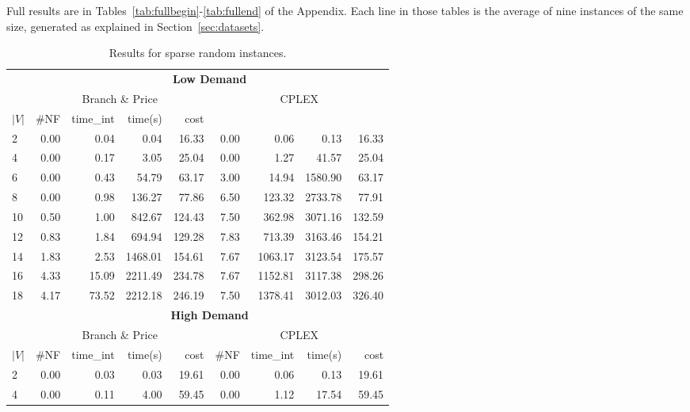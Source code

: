 Full results are in Tables~\ref{tab:fullbegin}-\ref{tab:fullend} of the Appendix.
Each line in those tables is the average of nine instances of the same size, generated as explained in Section~\ref{sec:datasets}.

\begin{table*}[h]
\small
\begin{center}
\caption{Results for sparse random instances.}\label{tab:sparse}
\begin{tabular} {l | r r r r | r r r r }
\hline
      &  \multicolumn{8}{c}{ \textbf{Low Demand} }                           \\
      &  \multicolumn{4}{c|}{Branch \& Price} & \multicolumn{4}{c}{CPLEX}    \\ 
$|V|$ & \#NF &  time\_int    &  time(s)       &  cost                         \\
\hline      
2& 0.00 & 0.04 & 0.04 & 16.33 & 0.00 & 0.06 & 0.13 & 16.33                 \\  
4& 0.00 & 0.17 & 3.05 & 25.04 & 0.00 & 1.27 & 41.57 & 25.04                \\
6& 0.00 & 0.43 & 54.79 & 63.17 & 3.00 & 14.94 & 1580.90 & 63.17            \\
8& 0.00 & 0.98 & 136.27 & 77.86 & 6.50 & 123.32 & 2733.78 & 77.91          \\
10& 0.50 & 1.00 & 842.67 & 124.43 & 7.50 & 362.98 & 3071.16 & 132.59       \\
12& 0.83 & 1.84 & 694.94 & 129.28 & 7.83 & 713.39 & 3163.46 & 154.21       \\
14& 1.83 & 2.53 & 1468.01 & 154.61 & 7.67 & 1063.17 & 3123.54 & 175.57     \\
16& 4.33 & 15.09 & 2211.49 & 234.78 & 7.67 & 1152.81 & 3117.38 & 298.26    \\
18& 4.17 & 73.52 & 2212.18 & 246.19 & 7.50 & 1378.41 & 3012.03 & 326.40    \\ 
\hline
       & \multicolumn{8}{c}{ \textbf{High Demand}} \\
       &       \multicolumn{4}{c|}{Branch \& Price} & \multicolumn{4}{c}{CPLEX}               \\  
$|V|$  & \#NF &  time\_int    &  time(s)       &  cost          &  \#NF &  time\_int  &  time(s)       &  cost \\
\hline      
2&   0.00 & 0.03 & 0.03 & 19.61 & 0.00 & 0.06 & 0.13 & 19.61             \\  
4&   0.00 & 0.11 & 4.00 & 59.45 & 0.00 & 1.12 & 17.54 & 59.45            \\

\end{tabular}
\end{center}
\end{table*}
